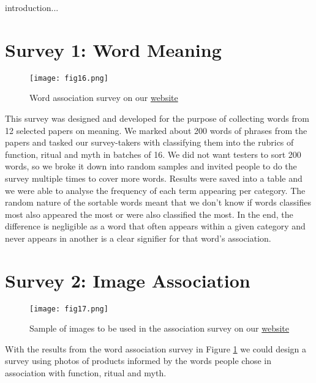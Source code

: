 \documentclass[12pt, usenames, dvipsnames]{report}
\begin{document}
\begin{flushleft}
introduction...


\section{Survey 1: Word Meaning}

\vspace*{1.2em}
\begin{figure}[!htbp]
  \hspace*{-3.666em}
  \texttt{[image: fig16.png]}
  \caption{Word association survey on our \href{https://meaning.pub}{website}}
  \label{fig:figure16}
\end{figure}
\vspace*{1.2em}

This survey was designed and developed for the purpose of collecting words from 12 selected papers on meaning. 
We marked about 200 words of phrases from the papers and tasked our survey-takers with classifying them into the rubrics of function, ritual and myth in batches of 16.
We did not want testers to sort 200 words, so we broke it down into random samples and invited people to do the survey multiple times to cover more words.
Results were saved into a table and we were able to analyse the frequency of each term appearing per category.
The random nature of the sortable words meant that we don't know if words classifies most also appeared the most or were also classified the most.
In the end, the difference is negligible as a word that often appears within a given category and never appears in another is a clear signifier for that word's association.


\section{Survey 2: Image Association}

\vspace*{1.2em}
\begin{figure}[!htbp]
  \hspace*{-3.666em}
  \texttt{[image: fig17.png]}
  \caption{Sample of images to be used in the association survey on our \href{https://meaning.pub}{website}}
  \label{fig:figure17}
\end{figure}
\vspace*{1.2em}

With the results from the word association survey in Figure \ref{fig:figure16} we could design a survey using photos of products informed by the words people chose in association with function, ritual and myth.


\end{flushleft}
\end{document}
